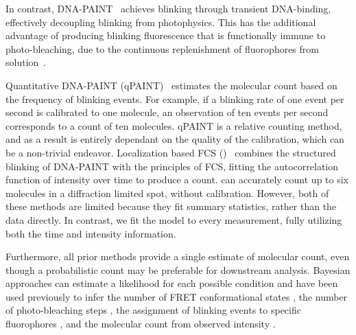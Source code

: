 %
In contrast, DNA-PAINT~\citep{schnitzbauer_2017} achieves blinking through transient 
DNA-binding, effectively decoupling blinking from photophysics. This has 
the additional advantage of producing blinking fluorescence that is functionally immune to 
photo-bleaching, due to the continuous replenishment of fluorophores from 
solution~\citep{stehr_2021}.

  Quantitative DNA-PAINT (qPAINT)~\citep{jungmann_2016} estimates the molecular
  count based on the frequency of blinking events. For example, if a blinking rate of one
  event per second is calibrated to one molecule, an observation of
  ten events per second corresponds to a count of ten molecules. 
  qPAINT is a relative counting method, and as a result is entirely dependant on the quality of 
  the calibration, which can be a non-trivial endeavor.
  Localization based FCS (\lbfcs)~\citep{stein_2019,stein_2021} combines the
  structured blinking of DNA-PAINT with the principles of FCS, fitting the
  autocorrelation function of intensity over time to produce a count. \lbfcs 
  can accurately count up to six molecules in a diffraction
  limited spot, without calibration.
  However, both of these methods are limited because they fit summary
  statistics, rather than the data directly.
  In contrast, we fit the model to every measurement, 
  fully utilizing both the time and intensity information.
  
Furthermore, all prior methods provide a single estimate of molecular count, even though 
a probabilistic count may be preferable for downstream analysis.
  Bayesian approaches can estimate a likelihood for each possible condition 
  and have been used previously to infer the number of FRET conformational 
  states \citep{hon_bayesian-estimated_2019, bronson_learning_2009}, 
  the number of photo-bleaching steps \citep{garry_bayesian_2020},
  the assignment of blinking events to specific fluorophores \citep{gabitto_bayesian_2021, fazel_bayesian_2019},
  and the molecular count from observed intensity \citep{nino_2017}.

